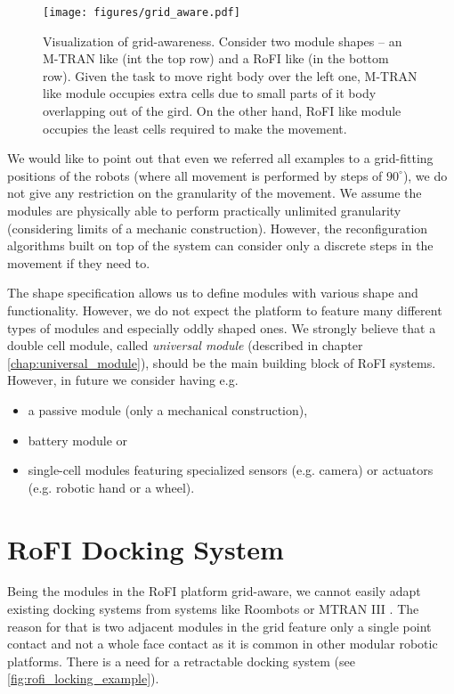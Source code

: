 \begin{figure}
    \centering
    \texttt{[image: figures/grid\_aware.pdf]}
    \caption{Visualization of grid-awareness. Consider two module shapes -- an
    M-TRAN\cite{haruhisa_kurokawa_m-tran_2003} like (int the top row) and a RoFI
    like (in the bottom row). Given the task to move right body over the left
    one, M-TRAN like module occupies extra cells due to small parts of it body
    overlapping out of the gird. On the other hand, RoFI like module occupies
    the least cells required to make the movement. }
    \label{fig:grid_aware}
\end{figure}

We would like to point out that even we referred all examples to a grid-fitting
positions of the robots (where all movement is performed by steps of
$90^\circ$), we do not give any restriction on the granularity of the movement.
We assume the modules are physically able to perform practically unlimited
granularity (considering limits of a mechanic construction). However, the
reconfiguration algorithms built on top of the system can consider only a
discrete steps in the movement if they need to.

The shape specification allows us to define modules with various shape and
functionality. However, we do not expect the platform to feature many different
types of modules and especially oddly shaped ones. We strongly believe that a
double cell module, called \emph{universal module} (described in chapter
\ref{chap:universal_module}), should be the main building block of RoFI systems.
However, in future we consider having e.g.
\begin{itemize}
    \item a passive module (only a mechanical construction),
    \item battery module or
    \item single-cell modules featuring specialized sensors (e.g. camera) or
    actuators (e.g. robotic hand or a wheel).
\end{itemize}


\section{RoFI Docking System}\label{sec:dock}

Being the modules in the RoFI platform grid-aware, we cannot easily adapt
existing docking systems from systems like
Roombots\cite{bonardi_locomotion_2012} or MTRAN III
\cite{kurokawa_distributed_2008}. The reason for that is two adjacent modules in
the grid feature only a single point contact and not a whole face contact as it
is common in other modular robotic platforms. There is a need for a retractable
docking system (see \ref{fig:rofi_locking_example}).

